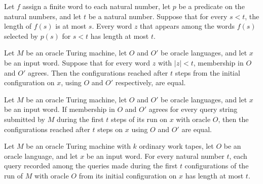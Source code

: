 \begin{theorem}
\label{Turing.OracleTM.length_le_of_mem_filtered_queries}
\leanok
{}
Let $f$ assign a finite word to each natural number, let $p$ be a predicate on the
natural numbers, and let $t$ be a natural number. Suppose that for every $s<t$, the
length of $f(s)$ is at most $s$. Every word $z$ that appears among the words $f(s)$
selected by $p(s)$ for $s<t$ has length at most $t$.
\end{theorem}

\begin{theorem}
\label{Turing.OracleTM.runFrom_eq_of_agree_length_lt}
\leanok
{}
Let $M$ be an oracle Turing machine, let $O$ and $O'$ be oracle languages, and let $x$
be an input word. Suppose that for every word $z$ with $|z|<t$, membership in $O$ and
$O'$ agrees. Then the configurations reached after $t$ steps from the initial
configuration on $x$, using $O$ and $O'$ respectively, are equal.
\end{theorem}

\begin{theorem}
\label{Turing.OracleTM.runFrom_eq_of_agree_queriesWithin}
\leanok
{}
Let $M$ be an oracle Turing machine, let $O$ and $O'$ be oracle languages, and let $x$
be an input word. If membership in $O$ and $O'$ agrees for every query string submitted
by $M$ during the first $t$ steps of its run on $x$ with oracle $O$, then the
configurations reached after $t$ steps on $x$ using $O$ and $O'$ are equal.
\end{theorem}

\begin{theorem}
\label{Turing.OracleTM.length_le_of_mem_queriesWithin}
\leanok
{}
Let $M$ be an oracle Turing machine with $k$ ordinary work tapes, let $O$ be an oracle
language, and let $x$ be an input word. For every natural number $t$, each query
recorded among the queries made during the first $t$ configurations of the run of $M$
with oracle $O$ from its initial configuration on $x$ has length at most $t$.
\end{theorem}

